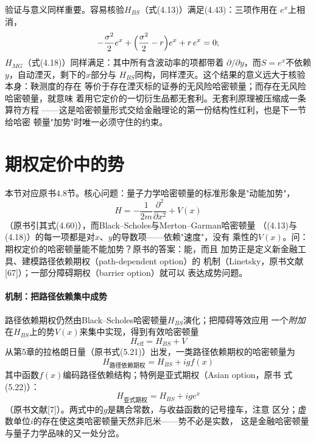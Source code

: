 验证与意义同样重要。容易核验$H_{BS}$（式(4.13)）满足(4.43)：三项作用在
$e^{x}$上相消，
\begin{equation*}
-\frac{\sigma^{2}}{2}e^{x}
+\Bigl(\frac{\sigma^{2}}{2}-r\Bigr)e^{x}+r\,e^{x}=0;
\end{equation*}
$H_{MG}$（式(4.18)）同样满足：其中所有含波动率的项都带着
$\partial/\partial y$，而$S=e^{x}$不依赖$y$，自动湮灭，剩下的$x$部分与
$H_{BS}$同构，同样湮灭。这个结果的意义远大于核验本身：鞅测度的存在
等价于存在湮灭标的证券的无风险哈密顿量；而存在无风险哈密顿量，就意味
着用它定价的一切衍生品都无套利。无套利原理被压缩成一条算符方程
——这是哈密顿量形式交给金融理论的第一份结构性红利，也是下一节给哈密
顿量"加势"时唯一必须守住的约束。

\section{期权定价中的势}

本节对应原书4.8节。核心问题：量子力学哈密顿量的标准形象是"动能加势"，
\begin{equation*}
H=-\frac{1}{2m}\frac{\partial^{2}}{\partial x^{2}}+V(x)
\end{equation*}
（原书引其式(4.60)），而Black--Scholes与Merton--Garman哈密顿量
（(4.13)与(4.18)）的每一项都是对$x$、$y$的导数项——依赖"速度"，没有
乘性的$V(x)$。问：期权定价的哈密顿量能不能加势？原书的答案：能，而且
加势正是定义新金融工具、建模路径依赖期权（path-dependent option）的
机制（Linetsky，原书文献[67]）；一部分障碍期权（barrier option）就可以
表达成势问题。

\paragraph{机制：把路径依赖集中成势}
路径依赖期权仍然由Black--Scholes哈密顿量$H_{BS}$演化；把障碍等效应用
一个\emph{附加}在$H_{BS}$上的势$V(x)$来集中实现，得到有效哈密顿量
\begin{equation*}
H_{\mathrm{eff}}=H_{BS}+V
\end{equation*}
从第5章的拉格朗日量（原书式(5.21)）出发，一类路径依赖期权的哈密顿量为
\begin{equation*}
H_{\text{路径依赖期权}}=H_{BS}+igf(x)
\end{equation*}
其中函数$f(x)$编码路径依赖结构；特例是亚式期权（Asian option，原书
式(5.22)）：
\begin{equation*}
H_{\text{亚式期权}}=H_{BS}+ige^{x}
\end{equation*}
（原书文献[7]）。两式中的$g$是耦合常数，与收益函数的记号撞车，注意
区分；虚数单位$i$的存在使这类哈密顿量天然非厄米——势不必是实数，
这是金融哈密顿量与量子力学品味的又一处分岔。

